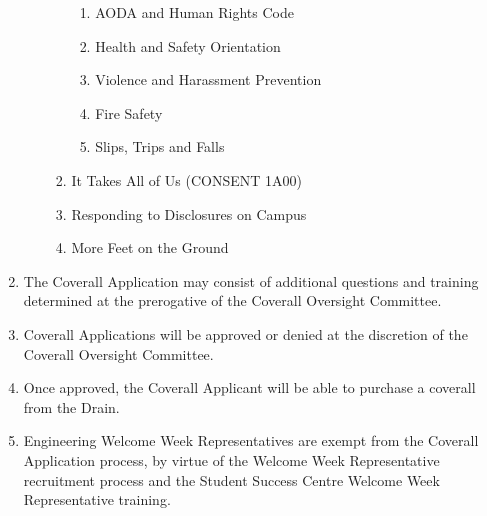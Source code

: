 \begin{enumerate}
\begin{enumerate}
\begin{enumerate}
      \begin{enumerate}
       \item
        AODA and Human Rights Code
       \item
        Health and Safety Orientation
       \item
        Violence and Harassment Prevention
       \item
        Fire Safety
       \item
        Slips, Trips and Falls
      \end{enumerate}
     \item
      It Takes All of Us (CONSENT 1A00)
     \item
      Responding to Disclosures on Campus
     \item
      More Feet on the Ground
    \end{enumerate}
  \end{enumerate}
 \item
  The Coverall Application may consist of additional questions and
  training determined at the prerogative of the Coverall Oversight
  Committee.
 \item
  Coverall Applications will be approved or denied at the discretion of
  the Coverall Oversight Committee.
 \item
  Once approved, the Coverall Applicant will be able to purchase a
  coverall from the Drain.
 \item
  Engineering Welcome Week Representatives are exempt from the Coverall
  Application process, by virtue of the Welcome Week Representative
  recruitment process and the Student Success Centre Welcome Week
  Representative training.
\end{enumerate}